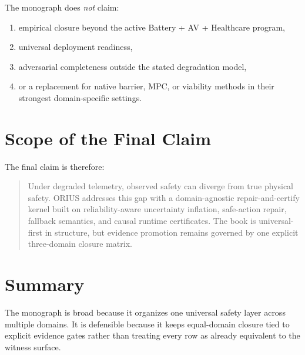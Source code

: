 The monograph does \emph{not} claim:

\begin{enumerate}
  \item empirical closure beyond the active Battery + AV + Healthcare program,
  \item universal deployment readiness,
  \item adversarial completeness outside the stated degradation model,
  \item or a replacement for native barrier, MPC, or viability methods in
    their strongest domain-specific settings.
\end{enumerate}

\section{Scope of the Final Claim}

The final claim is therefore:

\begin{quote}
Under degraded telemetry, observed safety can diverge from true physical
safety. ORIUS addresses this gap with a domain-agnostic repair-and-certify
kernel built on reliability-aware uncertainty inflation, safe-action repair,
fallback semantics, and causal runtime certificates. The book is
universal-first in structure, but evidence promotion remains governed by one
explicit three-domain closure matrix.
\end{quote}

\section{Summary}

The monograph is broad because it organizes one universal safety layer across
multiple domains. It is defensible because it keeps equal-domain closure tied
to explicit evidence gates rather than treating every row as already equivalent
to the witness surface.
